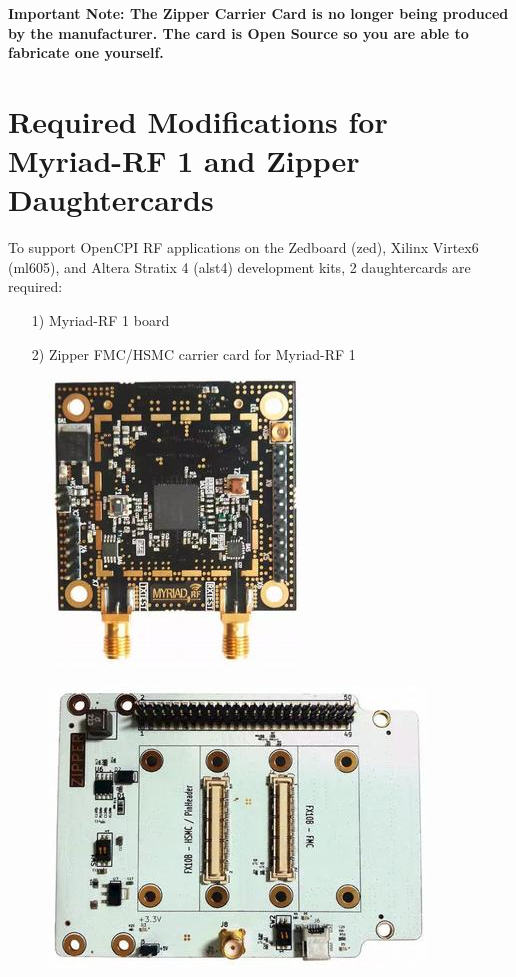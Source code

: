 \documentclass{article}
\begin{document}
\textbf{Important Note: The Zipper Carrier Card is no longer being produced by the manufacturer. The card is Open Source so you are able to fabricate one yourself.}
\section*{Required Modifications for Myriad-RF 1 and Zipper Daughtercards}
To support OpenCPI RF applications on the Zedboard (zed), Xilinx Virtex6 (ml605), and Altera Stratix 4 (alst4) development kits, 2 daughtercards are required:\par
	\begin{itemize}
	\item[1)] Myriad-RF 1 board
	\item[2)] Zipper FMC/HSMC carrier card for Myriad-RF 1
	\end{itemize}
	\begin{figure}[ht]
	\centering
		\begin{minipage}{.5\textwidth}
			\centering\includegraphics[width=0.65\linewidth]{myriadrf}
			\label{fig:myriadrf}
		\end{minipage}%
		\begin{minipage}{.5\textwidth}
			\centering\includegraphics[width=1.0\linewidth]{zipper}
			\label{fig:zipper}
		\end{minipage}
	\end{figure}
\end{document}
